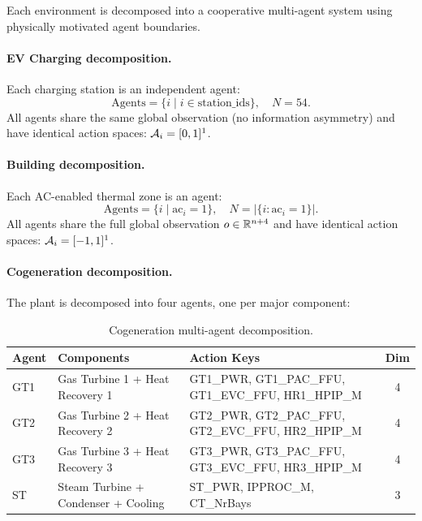 Each environment is decomposed into a cooperative multi-agent system using physically motivated agent boundaries.

\paragraph{EV Charging decomposition.} Each charging station is an independent agent:
\begin{equation}
    \text{Agents} = \{i \mid i \in \text{station\_ids}\}, \quad N = 54.
\end{equation}
All agents share the same global observation (no information asymmetry) and have identical action spaces: $\mathcal{A}_i = [0, 1]^1$.

\paragraph{Building decomposition.} Each AC-enabled thermal zone is an agent:
\begin{equation}
    \text{Agents} = \{i \mid \text{ac}_i = 1\}, \quad N = |\{i : \text{ac}_i = 1\}|.
\end{equation}
All agents share the full global observation $o \in \mathbb{R}^{n+4}$ and have identical action spaces: $\mathcal{A}_i = [-1, 1]^1$.

\paragraph{Cogeneration decomposition.} The plant is decomposed into four agents, one per major component:

\begin{table}[htbp]
\centering
\caption{Cogeneration multi-agent decomposition.}
\label{tab:cogen_marl_agents}
\begin{tabular}{@{}lllc@{}}
\toprule
\textbf{Agent} & \textbf{Components} & \textbf{Action Keys} & \textbf{Dim} \\
\midrule
GT1 & Gas Turbine 1 + Heat Recovery 1 & GT1\_PWR, GT1\_PAC\_FFU, GT1\_EVC\_FFU, HR1\_HPIP\_M & 4 \\
GT2 & Gas Turbine 2 + Heat Recovery 2 & GT2\_PWR, GT2\_PAC\_FFU, GT2\_EVC\_FFU, HR2\_HPIP\_M & 4 \\
GT3 & Gas Turbine 3 + Heat Recovery 3 & GT3\_PWR, GT3\_PAC\_FFU, GT3\_EVC\_FFU, HR3\_HPIP\_M & 4 \\
ST & Steam Turbine + Condenser + Cooling & ST\_PWR, IPPROC\_M, CT\_NrBays & 3 \\
\bottomrule
\end{tabular}
\end{table}

